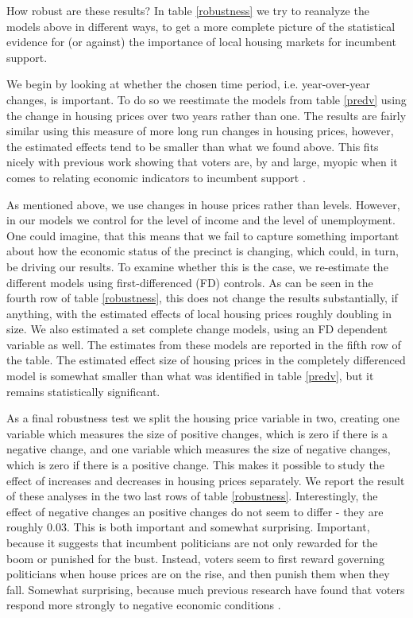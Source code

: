 \documentclass[12pt,a4paper]{article}
\begin{document}
How robust are these results? In table \ref{robustness} we try to reanalyze the models above in different ways, to get a more complete picture of the statistical evidence for (or against) the importance of local housing markets for incumbent support. 

We begin by looking at whether the chosen time period, i.e. year-over-year changes, is important. To do so we reestimate the models from table \ref{predv} using the change in housing prices over two years rather than one. The results are fairly similar using this measure of more long run changes in housing prices, however, the estimated effects tend to be smaller than what we found above. This fits nicely with previous work showing that voters are, by and large, myopic when it comes to relating economic indicators to incumbent support \citep{healy2009myopic,healy2014substituting}. 

As mentioned above, we use changes in house prices rather than levels. However, in our models we control for the level of income and the level of unemployment. One could imagine, that this means that we fail to capture something important about how the economic status of the precinct is changing, which could, in turn, be driving our results. To examine whether this is the case, we re-estimate the different models using first-differenced (FD) controls. As can be seen in the fourth row of table \ref{robustness}, this does not change the results substantially, if anything, with the estimated effects of local housing prices roughly doubling in size. We also estimated a set complete change models, using an FD dependent variable as well. The estimates from these models are reported in the fifth row of the table. The estimated effect size of housing prices in the completely differenced model is somewhat smaller than what was identified in table \ref{predv}, but it remains statistically significant.

As a final robustness test we split the housing price variable in two, creating one variable which measures the size of positive changes, which is zero if there is a negative change, and one variable which measures the size of negative changes, which is zero if there is a positive change. This makes it possible to study the effect of increases and decreases in housing prices separately. We report the result of these analyses in the two last rows of table \ref{robustness}. Interestingly, the effect of negative changes an positive changes do not seem to differ - they are roughly 0.03. This is both important and somewhat surprising. Important, because it suggests that incumbent politicians are not only rewarded for the boom or punished for the bust. Instead, voters seem to first reward governing politicians when house prices are on the rise, and then punish them when they fall. Somewhat surprising, because much previous research have found that voters respond more strongly to negative economic conditions \citep[e.g.][]{bloom1975voter,headrick1991attention,soroka2014negativity}.
\end{document}
